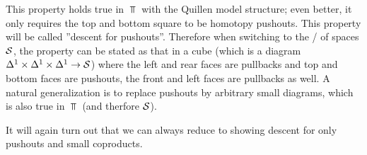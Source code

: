 This property holds true in $\Top$ with the Quillen model structure; even better, it only requires the top and bottom square to be homotopy pushouts.
This property will be called ''descent for pushouts''.
Therefore when switching to the \inftycat/ of spaces $\mathcal{S}$, the property can be stated as that in a cube (which is a diagram $\Delta^1\times\Delta^1\times\Delta^1\to\mathcal{S}$) where the left and rear faces are pullbacks and top and bottom faces are pushouts, the front and left faces are pullbacks as well.
A natural generalization is to replace pushouts by arbitrary small diagrams, which is also true in $\Top$ (and therfore $\mathcal{S}$).

It will again turn out that we can always reduce to showing descent for only pushouts and small coproducts.